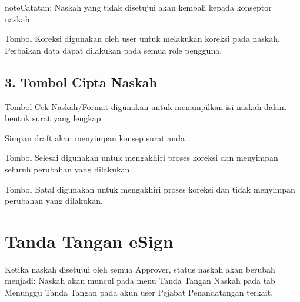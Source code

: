 \documentclass[letterpaper,10pt,bahasai]{sphinxmanual}
\begin{document}
\noindent{}

\begin{sphinxadmonition}{note}{Catatan:}
Naskah yang tidak disetujui akan kembali kepada konseptor naskah.
\end{sphinxadmonition}

\begin{DUlineblock}{0em}
\item[]  Tombol Koreksi digunakan oleh user untuk melakukan koreksi pada naskah. Perbaikan data dapat dilakukan pada semua role pengguna.
\end{DUlineblock}


\section{3. Tombol Cipta Naskah}
\label{\detokenize{ciptanaskah:tombol-cipta-naskah}}
\begin{DUlineblock}{0em}
\item[]  Tombol Cek Naskah/Format digunakan untuk menampilkan isi naskah dalam bentuk surat yang lengkap 
\item[]  Simpan draft akan menyimpan konsep surat anda
\item[]  Tombol Selesai digunakan untuk mengakhiri proses koreksi dan menyimpan seluruh perubahan yang dilakukan.
\item[]  Tombol Batal digunakan untuk mengakhiri proses koreksi dan tidak menyimpan perubahan yang dilakukan.
\end{DUlineblock}

\noindent{}


\chapter{Tanda Tangan eSign}
\label{\detokenize{ciptanaskah:tanda-tangan-esign}}
\noindent{}

Ketika naskah disetujui oleh semua Approver, status naskah akan berubah menjadi: 
Naskah akan muncul pada menu Tanda Tangan Naskah pada tab Menunggu Tanda Tangan pada akun user
Pejabat Penandatangan terkait.

\noindent{}
\end{document}

